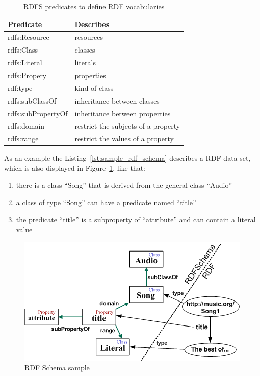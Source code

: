 \begin{table}[H]
\centering
\begin{tabular}{p{4cm}p{7cm}}
\hline
\textbf{Predicate} & \textbf{Describes} \\
\hline
rdfs:Resource & resources \\
\hline
rdfs:Class & classes \\
\hline
rdfs:Literal & literals \\
\hline
rdfs:Propery & properties \\
\hline
rdf:type	& kind of class \\
\hline
rdfs:subClassOf 	&	inheritance between classes \\
\hline
rdfs:subPropertyOf 	& inheritance between properties \\
\hline
rdfs:domain	&	restrict the subjects of a property \\
\hline
rdfs:range  & restrict the values of a property \\
\hline
\end{tabular}
\caption[\gls{RDFS} predicates to define \gls{RDF} vocabularies]{\gls{RDFS} predicates to define \gls{RDF} vocabularies \citep[pg. 89-90]{antoniou2008semantic}}
\label{tab:w3c_vocab_rdfs}
\end{table}

As an example the Listing~\ref{lst:sample_rdf_schema} describes a \gls{RDF} data set, which is also displayed in Figure~\ref{fig:images_rdfs_sample}, like that: \@

\begin{enumerate}
	\item there is a class ``Song'' that is derived from the general class ``Audio''
	\item a class of type ``Song'' can have a predicate named ``title''
	\item the predicate ``title'' is a subproperty of ``attribute'' and can contain a literal value
\end{enumerate}

\begin{figure}[H]
	\centering
	\includegraphics[width=0.8\columnwidth]{images/RDFSchema.png}
	\caption{RDF Schema sample}
	\label{fig:images_rdfs_sample}
\end{figure}

